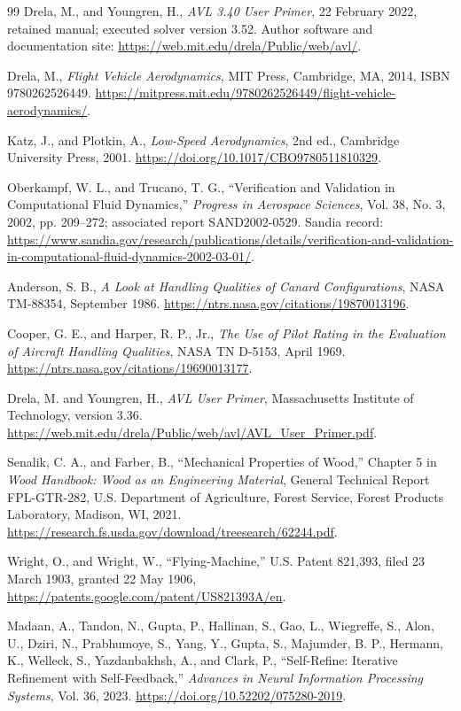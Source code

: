 \documentclass[10pt,letterpaper]{article}
\begin{document}
\begin{thebibliography}{99}
 Drela, M., and Youngren, H., \emph{AVL 3.40 User Primer}, 22 February 2022, retained manual; executed solver version 3.52. Author software and documentation site: \url{https://web.mit.edu/drela/Public/web/avl/}.

 Drela, M., \emph{Flight Vehicle Aerodynamics}, MIT Press, Cambridge, MA, 2014, ISBN 9780262526449. \url{https://mitpress.mit.edu/9780262526449/flight-vehicle-aerodynamics/}.

 Katz, J., and Plotkin, A., \emph{Low-Speed Aerodynamics}, 2nd ed., Cambridge University Press, 2001. \url{https://doi.org/10.1017/CBO9780511810329}.

 Oberkampf, W. L., and Trucano, T. G., ``Verification and Validation in Computational Fluid Dynamics,'' \emph{Progress in Aerospace Sciences}, Vol. 38, No. 3, 2002, pp. 209--272; associated report SAND2002-0529. Sandia record: \url{https://www.sandia.gov/research/publications/details/verification-and-validation-in-computational-fluid-dynamics-2002-03-01/}.

 Anderson, S. B., \emph{A Look at Handling Qualities of Canard Configurations}, NASA TM-88354, September 1986. \url{https://ntrs.nasa.gov/citations/19870013196}.

 Cooper, G. E., and Harper, R. P., Jr., \emph{The Use of Pilot Rating in the Evaluation of Aircraft Handling Qualities}, NASA TN D-5153, April 1969. \url{https://ntrs.nasa.gov/citations/19690013177}.

 Drela, M. and Youngren, H., \emph{AVL User Primer}, Massachusetts Institute of Technology, version 3.36. \url{https://web.mit.edu/drela/Public/web/avl/AVL_User_Primer.pdf}.

 Senalik, C. A., and Farber, B., ``Mechanical Properties of Wood,'' Chapter 5 in \emph{Wood Handbook: Wood as an Engineering Material}, General Technical Report FPL-GTR-282, U.S. Department of Agriculture, Forest Service, Forest Products Laboratory, Madison, WI, 2021. \url{https://research.fs.usda.gov/download/treesearch/62244.pdf}.

 Wright, O., and Wright, W., ``Flying-Machine,'' U.S. Patent 821,393, filed 23 March 1903, granted 22 May 1906, \url{https://patents.google.com/patent/US821393A/en}.

 Madaan, A., Tandon, N., Gupta, P., Hallinan, S., Gao, L., Wiegreffe, S., Alon, U., Dziri, N., Prabhumoye, S., Yang, Y., Gupta, S., Majumder, B. P., Hermann, K., Welleck, S., Yazdanbakhsh, A., and Clark, P., ``Self-Refine: Iterative Refinement with Self-Feedback,'' \emph{Advances in Neural Information Processing Systems}, Vol. 36, 2023. \url{https://doi.org/10.52202/075280-2019}.


\end{thebibliography}
\end{document}
